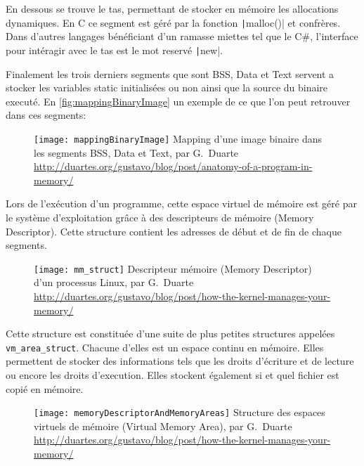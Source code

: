 En dessous se trouve le tas, permettant de stocker en mémoire les allocations dynamiques. En C ce segment est géré par la fonction \texttt|malloc()| et confrères. Dans d'autres langages bénéficiant d'un ramasse miettes tel que le C\#, l'interface pour intéragir avec le tas est le mot reservé \texttt|new|.

Finalement les trois derniers segments que sont BSS, Data et Text servent a stocker les variables static initialisées ou non ainsi que la source du binaire executé. En \autoref{fig:mappingBinaryImage} un exemple de ce que l'on peut retrouver dans ces segments:

\begin{figure}[H]
	\centering
	\texttt{[image: mappingBinaryImage]}
	{Mapping d'une image binaire dans les segments BSS, Data et Text, par G.~Duarte}
	{\url{http://duartes.org/gustavo/blog/post/anatomy-of-a-program-in-memory/}}
	\label{fig:mappingBinaryImage}
\end{figure}

Lors de l'exécution d'un programme, cette espace virtuel de mémoire est géré par le système d'exploitation grâce à des descripteurs de mémoire (Memory Descriptor). Cette structure contient les adresses de début et de fin de chaque segments.

\begin{figure}[H]
	\centering
	\texttt{[image: mm\_struct]}
	{Descripteur mémoire (Memory Descriptor) d'un processus Linux, par G.~Duarte}
	{\url{http://duartes.org/gustavo/blog/post/how-the-kernel-manages-your-memory/}}
	\label{fig:mm_struct}
\end{figure}

Cette structure est constituée d'une suite de plus petites structures appelées \texttt{vm_area_struct}. Chacune d'elles est un espace continu en mémoire. Elles permettent de stocker des informations tels que les droits d'écriture et de lecture ou encore les droits d'execution. Elles stockent également si et quel fichier est copié en mémoire.

\begin{figure}[H]
	\centering
	\texttt{[image: memoryDescriptorAndMemoryAreas]}
	{Structure des espaces virtuels de mémoire (Virtual Memory Area), par G.~Duarte}
	{\url{http://duartes.org/gustavo/blog/post/how-the-kernel-manages-your-memory/}}
	\label{fig:memoryDescriptorAndMemoryAreas}
\end{figure}

